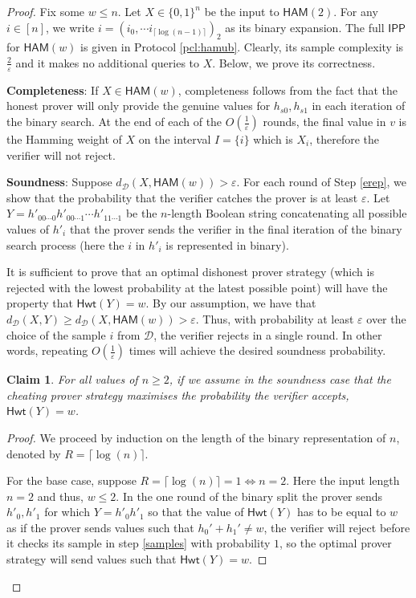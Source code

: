 \documentclass[11pt]{article}
\newtheorem{claim}[theorem]{Claim}
\newcommand{\Hamming}{\mathsf{Hwt}}
\newcommand{\HAM}{\mathsf{HAM}}
\newcommand{\IPP}{\mathsf{IPP}}
\newcommand{\sD}{\mathcal{D}}
\begin{document}
\begin{proof}
Fix some $w \leq n$. Let $X \in \{0,1\}^n$ be the input to $\HAM(2)$. For any $i \in [n]$, we write $i=(i_{0}, \cdots i_{\lceil \log(n-1)\rceil})_{2}$ as its binary expansion. The full $\IPP$ for $\HAM(w)$ is given in Protocol \ref{pcl:hamub}. Clearly, its sample complexity is $\frac{2}{\varepsilon}$ and it makes no additional queries to $X$. Below, we prove its correctness.

\textbf{Completeness}: If $X\in \HAM(w)$, completeness follows from the fact that the honest prover will only provide the genuine values for $h_{s0}, h_{s1}$ in each iteration of the binary search. At the end of each of the $O\left(\frac{1}{\varepsilon}\right)$ rounds, the final value in $v$ is the Hamming weight of $X$ on the interval $I=\{i\}$ which is $X_{i}$, therefore the verifier will not reject.

\textbf{Soundness}: Suppose $d_{\mathcal{D}}(X,\HAM(w))>\varepsilon$. For each round of Step \ref{erep}, we show that the probability that the verifier catches the prover is at least $\varepsilon$. Let $Y=h'_{00\cdots0}h'_{00\cdots1}\cdots h'_{11\cdots1}$ be the $n$-length Boolean string concatenating all possible values of $h'_{i}$ that the prover sends the verifier in the final iteration of the binary search process (here the $i$ in $h'_{i}$ is represented in binary). 

It is sufficient to prove that an optimal dishonest prover strategy (which is rejected with the lowest probability at the latest possible point) will have the property that $\Hamming(Y)=w$. By our assumption, we have that $d_{\mathcal{D}}(X,Y)\geq d_{\mathcal{D}}(X,\HAM(w))>\varepsilon$. Thus, with probability at least $\varepsilon$ over the choice of the sample $i$ from $\sD$, the verifier rejects in a single round. In other words, repeating $O\left(\frac{1}{\varepsilon}\right)$ times will achieve the desired soundness probability.

\begin{claim}
For all values of $n\geq 2$, if we assume in the soundness case that the cheating prover strategy maximises the probability the verifier accepts, $\Hamming(Y)=w$.
\end{claim}
\begin{proof}
We proceed by induction on the length of the binary representation of $n$, denoted by $R =\lceil \log(n)\rceil$.

For the base case, suppose $R=\lceil \log(n)\rceil=1 \iff n=2$. Here the input length $n =2$ and thus, $ w \leq 2$. In the one round of the binary split the prover sends $h'_{0}, h'_{1}$ for which $Y=h'_{0}h'_{1}$ so that the value of $\Hamming(Y)$ has to be equal to $w$ as if the prover sends values such that $h_{0}'+h_{1}'\neq w$, the verifier will reject before it checks its sample in step \ref{samples} with probability $1$, so the optimal prover strategy will send values such that $\Hamming(Y)=w$.


\end{proof}
\end{proof}
\end{document}
